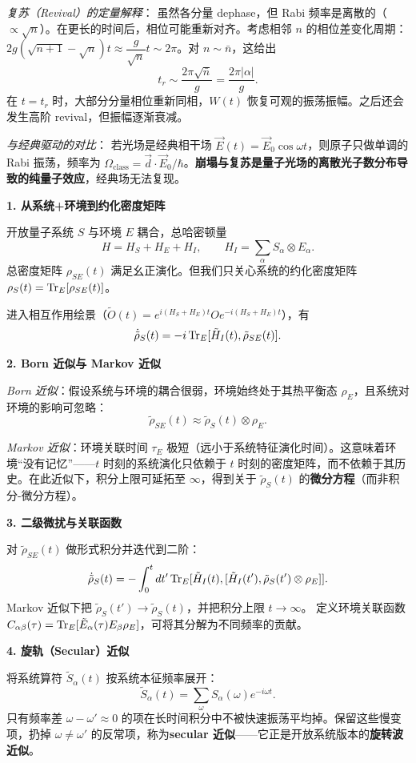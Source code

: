 \textit{复苏（Revival）的定量解释}：
虽然各分量 dephase，但 Rabi 频率是离散的（$\propto\sqrt{n}$）。在更长的时间后，相位可能重新对齐。考虑相邻 $n$ 的相位差变化周期：$2g(\sqrt{n+1}-\sqrt{n})t \approx \dfrac{g}{\sqrt{n}}t \sim 2\pi$。对 $n\sim\bar{n}$，这给出
\[
\boxed{t_r \sim \frac{2\pi\sqrt{\bar{n}}}{g} = \frac{2\pi|\alpha|}{g}}.
\]
在 $t=t_r$ 时，大部分分量相位重新同相，$W(t)$ 恢复可观的振荡振幅。之后还会发生高阶 revival，但振幅逐渐衰减。

\textit{与经典驱动的对比}：
若光场是经典相干场 $\vec{E}(t) = \vec{E}_0\cos\omega t$，则原子只做单调的 Rabi 振荡，频率为 $\Omega_{\text{class}} = \vec{d}\cdot\vec{E}_0/\hbar$。\textbf{崩塌与复苏是量子光场的离散光子数分布导致的纯量子效应}，经典场无法复现。

\textbf{1. 从系统+环境到约化密度矩阵}

开放量子系统 $S$ 与环境 $E$ 耦合，总哈密顿量
\[
H = H_S + H_E + H_I, \qquad H_I = \sum_\alpha S_\alpha \otimes E_\alpha.
\]
总密度矩阵 $\rho_{SE}(t)$ 满足幺正演化。但我们只关心系统的约化密度矩阵 $\rho_S(t) = \Tr_E[\rho_{SE}(t)]$。

进入相互作用绘景（$\tilde{O}(t) = e^{i(H_S+H_E)t}O e^{-i(H_S+H_E)t}$），有
\[
\dot{\tilde{\rho}}_S(t) = -i\Tr_E[\tilde{H}_I(t), \tilde{\rho}_{SE}(t)].
\]

\textbf{2. Born 近似与 Markov 近似}

\textit{Born 近似}：假设系统与环境的耦合很弱，环境始终处于其热平衡态 $\rho_E$，且系统对环境的影响可忽略：
\[
\tilde{\rho}_{SE}(t) \approx \tilde{\rho}_S(t) \otimes \rho_E.
\]

\textit{Markov 近似}：环境关联时间 $\tau_E$ 极短（远小于系统特征演化时间）。这意味着环境``没有记忆''——$t$ 时刻的系统演化只依赖于 $t$ 时刻的密度矩阵，而不依赖于其历史。在此近似下，积分上限可延拓至 $\infty$，得到关于 $\tilde{\rho}_S(t)$ 的\textbf{微分方程}（而非积分-微分方程）。

\textbf{3. 二级微扰与关联函数}

对 $\tilde{\rho}_{SE}(t)$ 做形式积分并迭代到二阶：
\[
\dot{\tilde{\rho}}_S(t) = -\int_0^t dt' \Tr_E[\tilde{H}_I(t), [\tilde{H}_I(t'), \tilde{\rho}_S(t')\otimes\rho_E]].
\]
Markov 近似下把 $\tilde{\rho}_S(t') \to \tilde{\rho}_S(t)$，并把积分上限 $t\to\infty$。
定义环境关联函数 $C_{\alpha\beta}(\tau) = \Tr_E[\tilde{E}_\alpha(\tau)E_\beta\rho_E]$，可将其分解为不同频率的贡献。

\textbf{4. 旋轨（Secular）近似}

将系统算符 $\tilde{S}_\alpha(t)$ 按系统本征频率展开：
\[
\tilde{S}_\alpha(t) = \sum_\omega S_\alpha(\omega) e^{-i\omega t}.
\]
只有频率差 $\omega-\omega' \approx 0$ 的项在长时间积分中不被快速振荡平均掉。保留这些慢变项，扔掉 $\omega\neq\omega'$ 的反常项，称为\textbf{secular 近似}——它正是开放系统版本的\textbf{旋转波近似}。

